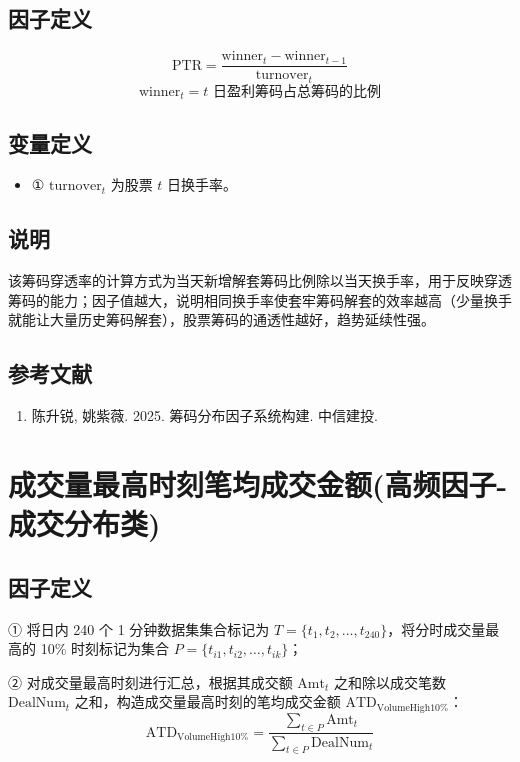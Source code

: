 \documentclass{article}
\begin{document}
\subsection{因子定义}
\begin{equation}
    \mathrm{PTR} = \frac{\mathrm{winner}_t - \mathrm{winner}_{t-1}}{\mathrm{turnover}_t}
\end{equation}
\begin{equation}
    \mathrm{winner}_t = t \text{ 日盈利筹码占总筹码的比例}
\end{equation}

\subsection{变量定义}
\begin{itemize}
    \item ① \( \mathrm{turnover}_t \) 为股票 \( t \) 日换手率。
\end{itemize}

\subsection{说明}
该筹码穿透率的计算方式为当天新增解套筹码比例除以当天换手率，用于反映穿透筹码的能力；因子值越大，说明相同换手率使套牢筹码解套的效率越高（少量换手就能让大量历史筹码解套），股票筹码的通透性越好，趋势延续性强。

\subsection{参考文献}
\begin{enumerate}
    \item 陈升锐, 姚紫薇. 2025. 筹码分布因子系统构建. 中信建投.
\end{enumerate}

\section{成交量最高时刻笔均成交金额(高频因子-成交分布类)}

\subsection{因子定义}

① 将日内 240 个 1 分钟数据集集合标记为 \( T = \{t_1, t_2, \dots, t_{240}\} \)，将分时成交量最高的 10\% 时刻标记为集合 \( P = \{t_{i1}, t_{i2}, \dots, t_{ik}\} \)；

② 对成交量最高时刻进行汇总，根据其成交额 \( \mathrm{Amt}_t \) 之和除以成交笔数 \( \mathrm{DealNum}_t \) 之和，构造成交量最高时刻的笔均成交金额 \( \mathrm{ATD}_{\mathrm{VolumeHigh10\%}} \)：
\begin{equation}
    \mathrm{ATD}_{\mathrm{VolumeHigh10\%}} = \frac{\sum_{t \in P} \mathrm{Amt}_t}{\sum_{t \in P} \mathrm{DealNum}_t}
\end{equation}
\end{document}
